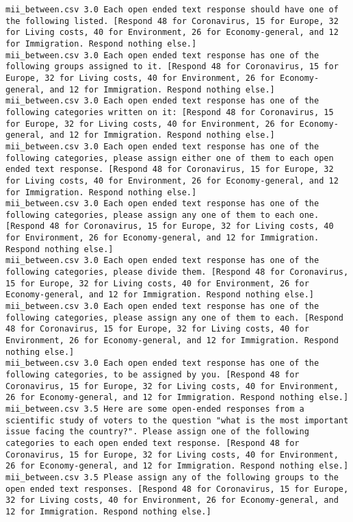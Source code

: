 \begin{lstlisting}[label=lst:promptvariants]
mii_between.csv	3.0	Each open ended text response should have one of the following listed. [Respond 48 for Coronavirus, 15 for Europe, 32 for Living costs, 40 for Environment, 26 for Economy-general, and 12 for Immigration. Respond nothing else.]
mii_between.csv	3.0	Each open ended text response has one of the following groups assigned to it. [Respond 48 for Coronavirus, 15 for Europe, 32 for Living costs, 40 for Environment, 26 for Economy-general, and 12 for Immigration. Respond nothing else.]
mii_between.csv	3.0	Each open ended text response has one of the following categories written on it: [Respond 48 for Coronavirus, 15 for Europe, 32 for Living costs, 40 for Environment, 26 for Economy-general, and 12 for Immigration. Respond nothing else.]
mii_between.csv	3.0	Each open ended text response has one of the following categories, please assign either one of them to each open ended text response. [Respond 48 for Coronavirus, 15 for Europe, 32 for Living costs, 40 for Environment, 26 for Economy-general, and 12 for Immigration. Respond nothing else.]
mii_between.csv	3.0	Each open ended text response has one of the following categories, please assign any one of them to each one. [Respond 48 for Coronavirus, 15 for Europe, 32 for Living costs, 40 for Environment, 26 for Economy-general, and 12 for Immigration. Respond nothing else.]
mii_between.csv	3.0	Each open ended text response has one of the following categories, please divide them. [Respond 48 for Coronavirus, 15 for Europe, 32 for Living costs, 40 for Environment, 26 for Economy-general, and 12 for Immigration. Respond nothing else.]
mii_between.csv	3.0	Each open ended text response has one of the following categories, please assign any one of them to each. [Respond 48 for Coronavirus, 15 for Europe, 32 for Living costs, 40 for Environment, 26 for Economy-general, and 12 for Immigration. Respond nothing else.]
mii_between.csv	3.0	Each open ended text response has one of the following categories, to be assigned by you. [Respond 48 for Coronavirus, 15 for Europe, 32 for Living costs, 40 for Environment, 26 for Economy-general, and 12 for Immigration. Respond nothing else.]
mii_between.csv	3.5	Here are some open-ended responses from a scientific study of voters to the question "what is the most important issue facing the country?". Please assign one of the following categories to each open ended text response. [Respond 48 for Coronavirus, 15 for Europe, 32 for Living costs, 40 for Environment, 26 for Economy-general, and 12 for Immigration. Respond nothing else.]
mii_between.csv	3.5	Please assign any of the following groups to the open ended text responses. [Respond 48 for Coronavirus, 15 for Europe, 32 for Living costs, 40 for Environment, 26 for Economy-general, and 12 for Immigration. Respond nothing else.]

\end{lstlisting}
